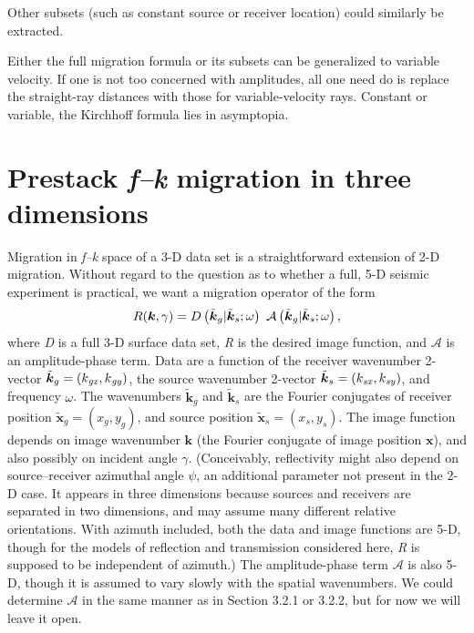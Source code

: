 Other subsets (such as constant source or receiver location) could similarly be extracted.

Either the full migration formula or its subsets can be generalized to variable velocity. If one is not too concerned with amplitudes, all one
need do is replace the straight-ray distances with those for variable-velocity rays. Constant or variable, the Kirchhoff formula lies in asymptopia.

\section{Prestack \textit{f--k} migration in three dimensions}

Migration in \textit{f--k} space of a 3-D data set is a straightforward extension of 2-D migration. Without regard to the question as to whether a full, 5-D seismic experiment is practical, we want a migration operator of the form
\begin{equation}
\text{\textit{$R$}}(\boldsymbol{k},\gamma )=\text{\textit{$D$}}\left(\tilde{\boldsymbol{k}}_{\text{\textit{$g$}}}|
\tilde{\boldsymbol{k}}_{\text{\textit{$s$}}};\omega \right)\text{  }\mathcal{A}\left(\tilde{\boldsymbol{k}}_{\text{\textit{$g$}}}|\tilde{\boldsymbol{k}}_{\text{\textit{$s$}}};\omega \right),\end{equation}
where \textit{D} is a full 3-D surface data set, \textit{R} is the desired image function, and $\mathcal{A}$ is an amplitude-phase term. Data
are a function of the receiver wavenumber 2-vector \(\tilde{\boldsymbol{k}}_g=\left(k_{\text{\textit{gx}}}\text{\textit{$,$}}\,\text{\textit{$k$}}_{\text{\textit{gy}}}\right)\),
the source wavenumber 2-vector \(\tilde{\boldsymbol{k}}_s=\left(k_{\text{\textit{sx}}},k_{\text{\textit{sy}}}\right)\), and frequency $\omega $. The
wavenumbers \(\tilde{\boldsymbol{k}}_g\) and \(\tilde{\boldsymbol{k}}_s\) are the Fourier conjugates of receiver position \(\tilde{\boldsymbol{x}}_g=\left(x_g,y_g\right)\),
and source position \(\tilde{\boldsymbol{x}}_s=\left(x_s,y_s\right)\). The image function depends on image wavenumber \(\boldsymbol{k}\)
(the Fourier conjugate of image position \(\boldsymbol{x}\)), and also possibly on incident angle $\gamma $. (Conceivably, reflectivity might also
depend on source--receiver azimuthal angle $\psi $, an additional parameter not present in the 2-D case. It appears in three dimensions because sources and
receivers are separated in two dimensions, and may assume many different relative orientations. With azimuth included, both the data and image functions
are 5-D, though for the models of reflection and transmission considered here, \textit{R} is supposed to be independent of azimuth.)
The amplitude-phase term $\mathcal{A}$ is also 5-D, though it is assumed to vary slowly with the spatial wavenumbers. We could
determine $\mathcal{A}$ in the same manner as in Section 3.2.1 or 3.2.2, but for now we will leave it open.

